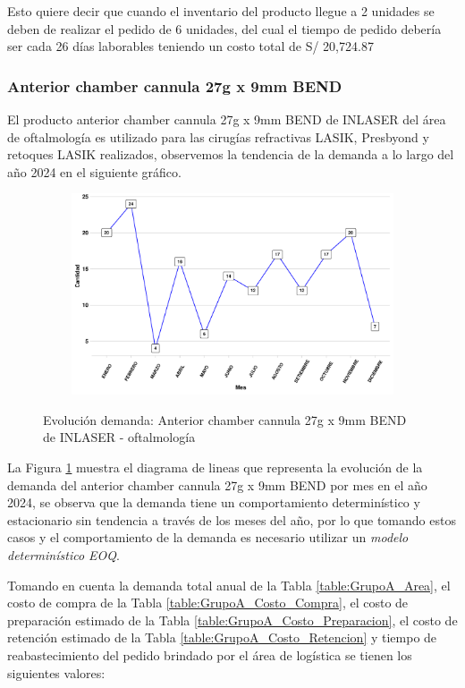 Esto quiere decir que cuando el inventario del producto llegue a 2 unidades se deben de realizar el pedido de 6 unidades, del cual el tiempo de pedido debería ser cada 26 días laborables teniendo un costo total de S/ 20,724.87
\subsubsection{Anterior chamber cannula 27g x 9mm BEND}

El producto anterior chamber cannula 27g x 9mm BEND de INLASER del área de oftalmología es utilizado para las cirugías refractivas LASIK, Presbyond y retoques LASIK realizados, observemos la tendencia de la demanda a lo largo del año 2024 en el siguiente gráfico.

\begin{figure}[H]
  \caption{Evolución demanda: Anterior chamber cannula 27g x 9mm BEND de INLASER - oftalmología}
  {\includegraphics[width=15cm, height=5.95cm]{images/PROD008_demanda.pdf}}
  \label{fig:PROD008_demanda}
\end{figure}

La Figura \ref{fig:PROD008_demanda} muestra el diagrama de lineas que representa la evolución de la demanda del anterior chamber cannula 27g x 9mm BEND por mes en el año 2024, se observa que la demanda tiene un comportamiento determinístico y estacionario sin tendencia a través de los meses del año, por lo que tomando estos casos y el comportamiento de la demanda es necesario utilizar un \textsl{modelo determinístico EOQ}.

Tomando en cuenta la demanda total anual de la Tabla \ref{table:GrupoA_Area}, el costo de compra de la Tabla \ref{table:GrupoA_Costo_Compra}, el costo de preparación estimado de la Tabla \ref{table:GrupoA_Costo_Preparacion}, el costo de retención estimado de la Tabla \ref{table:GrupoA_Costo_Retencion} y tiempo de reabastecimiento del pedido brindado por el área de logística se tienen los siguientes valores:

